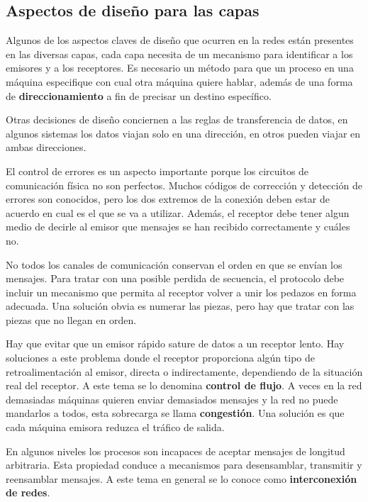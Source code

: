 \documentclass[10pt,a4paper]{report}
\begin{document}
\subsection{Aspectos de diseño para las capas}

Algunos de los aspectos claves de diseño que ocurren en la redes están presentes en 
las diversas capas, cada capa necesita de un mecanismo para identificar a los emisores 
y a los receptores. Es necesario un método para que un proceso en una máquina 
especifique con cual otra máquina quiere hablar, además de una forma de 
\textbf{direccionamiento} a fin de precisar un destino específico.

\par Otras decisiones de diseño conciernen a las reglas de transferencia de datos, en 
algunos sistemas los datos viajan solo en una dirección, en otros pueden viajar en 
ambas direcciones.

El control de errores es un aspecto importante porque los circuitos de comunicación 
física no son perfectos. Muchos códigos de corrección y detección de errores son 
conocidos, pero los dos extremos de la conexión deben estar de acuerdo en cual es el 
que se va a utilizar. Además, el receptor debe tener algun medio de decirle al emisor 
que mensajes se han recibido correctamente y cuáles no.

\par No todos los canales de comunicación conservan el orden en que se envían los 
mensajes. Para tratar con una posible perdida de secuencia, el protocolo debe incluir 
un mecanismo que permita al receptor volver a unir los pedazos en forma adecuada. 
Una solución obvia es numerar las piezas, pero hay que tratar con las piezas que no 
llegan en orden.

\par Hay que evitar que un emisor rápido sature de datos a un receptor lento. Hay 
soluciones a este problema donde el receptor proporciona algún tipo de 
retroalimentación al emisor, directa o indirectamente, dependiendo de la situación real 
del receptor. A este tema se lo denomina \textbf{control de flujo}. A veces en la red 
demasiadas máquinas quieren enviar demasiados mensajes y la red no puede 
mandarlos a todos, esta sobrecarga se llama \textbf{congestión}. Una solución es que 
cada máquina emisora reduzca el tráfico de salida.

\par En algunos niveles los procesos son incapaces de aceptar mensajes de longitud 
arbitraria. Esta propiedad conduce a mecanismos para desensamblar, transmitir y 
reensamblar mensajes. A este tema en general se lo conoce como 
\textbf{interconexión de redes}.
\end{document}
